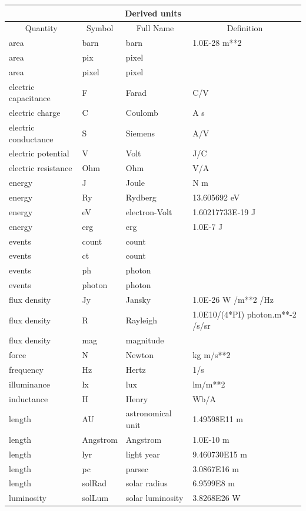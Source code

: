 \documentclass[twoside,11pt]{article}
\begin{document}
\begin{center}
\begin{tabular}{|l|l|l|l|}
\hline
\multicolumn{4}{|c|}{{\large Derived units}} \\ \hline
\multicolumn{1}{|c|}{Quantity} & \multicolumn{1}{|c|}{Symbol} &
\multicolumn{1}{c|}{Full Name} & \multicolumn{1}{c|}{Definition} \\ \hline
area & barn & barn & 1.0E-28 m**2 \\
area & pix & pixel & \\
area & pixel & pixel & \\
electric capacitance & F & Farad & C/V \\
electric charge & C & Coulomb & A s \\
electric conductance & S & Siemens & A/V \\
electric potential & V & Volt & J/C \\
electric resistance & Ohm & Ohm & V/A \\
energy & J & Joule & N m \\
energy & Ry & Rydberg & 13.605692 eV \\
energy & eV & electron-Volt & 1.60217733E-19 J \\
energy & erg & erg & 1.0E-7 J \\
events & count & count & \\
events & ct & count & \\
events & ph & photon & \\
events & photon & photon & \\
flux density & Jy & Jansky & 1.0E-26 W /m**2 /Hz \\
flux density & R & Rayleigh & 1.0E10/(4*PI) photon.m**-2 /s/sr \\
flux density & mag & magnitude & \\
force & N & Newton & kg m/s**2 \\
frequency & Hz & Hertz & 1/s \\
illuminance & lx & lux & lm/m**2 \\
inductance & H & Henry & Wb/A \\
length & AU & astronomical unit & 1.49598E11 m \\
length & Angstrom & Angstrom & 1.0E-10 m \\
length & lyr & light year & 9.460730E15 m \\
length & pc & parsec & 3.0867E16 m \\
length & solRad & solar radius & 6.9599E8 m \\
luminosity & solLum & solar luminosity & 3.8268E26 W \\

\end{tabular}
\end{center}
\end{document}
